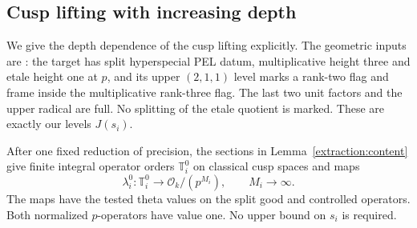 \subsection{Cusp lifting with increasing depth}

We give the depth dependence of the cusp lifting explicitly.
The geometric inputs are \cite[Lemmas~7.1--7.2]{C}: the target has split hyperspecial
PEL datum, multiplicative height three and etale height one at
$p$, and its upper $(2,1,1)$ level marks a rank-two flag and frame
inside the multiplicative rank-three flag.  The last two unit
factors and the upper radical are full.  No splitting of the
etale quotient is marked.  These are exactly our levels $J(s_i)$.

\begin{lemma}
\label{extraction:cusp}
After one fixed reduction of precision, the sections in
Lemma~\ref{extraction:content} give finite integral operator
orders $\mathbb T_i^0$ on classical cusp spaces and maps
\[
 \lambda_i^0:\mathbb T_i^0\longrightarrow
                 \mathcal O_k/(p^{M_i}),\qquad M_i\longrightarrow\infty.
\]
The maps have the tested theta values on the split good and
controlled operators.  Both normalized $p$-operators have value
one.  No upper bound on $s_i$ is required.
\end{lemma}

